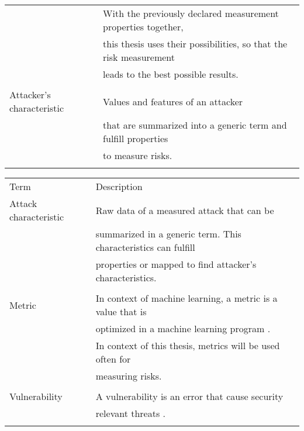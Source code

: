 \begin{center}
\begin{tabular}{ |l|l|  }
    & With the previously declared measurement properties together, \\
    & this thesis uses their possibilities, so that the risk measurement \\
    & leads to the best possible results. \\
    & \\
    \hline
    Attacker's characteristic & Values and features of an attacker \\
    & that are summarized into a generic term and fulfill properties \\
    & to measure risks. \\
    & \\
    \hline
  \end{tabular}
\end{center}

\begin{center}
  \begin{tabular}{ |l|l|  }
    \hline
    \rowcolor{lightgray} Term & Description \\ [0.5ex]
    Attack characteristic & Raw data of a measured attack that can be \\
    & summarized in a generic term. This characteristics can fulfill \\
    & properties or mapped to find attacker's characteristics. \\
    & \\
    \hline
    Metric & In context of machine learning, a metric is a value that is \\
    & optimized  in a machine learning program \cite{google}. \\
    & In context of this thesis, metrics will be used often for \\
    & measuring risks. \\
    & \\
    \hline
    Vulnerability & A vulnerability is an error that cause security \\
    & relevant threats \cite{bsi_glossar_2021}. \\
    & \\
    \hline
  \end{tabular}
\end{center}
